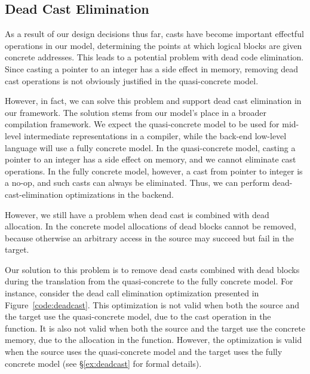 \subsection{Dead Cast Elimination}
\label{idea:deadcast}

As a result of our design decisions thus far, casts have become
important effectful operations in our model, determining the points at
which logical blocks are given concrete addresses. This leads to a
potential problem with dead code elimination.  Since casting a pointer
to an integer has a side effect in memory, removing dead cast
operations is not obviously justified in the quasi-concrete model.

However, in fact,
we can solve this problem and support dead cast elimination in our
framework. 
The solution stems from our model's place in a broader compilation
framework. We expect the quasi-concrete model to be used for mid-level
intermediate representations in a compiler, while the back-end
low-level language will use a fully concrete model. In the
quasi-concrete model, casting a pointer to an integer has a side
effect on memory, and we cannot eliminate cast operations. In the
fully concrete model, however, a cast from pointer to integer is a 
no-op, and such casts can always be eliminated. Thus, we can
perform dead-cast-elimination optimizations in the backend.

However, we still have a problem when dead cast is combined with dead
allocation. In the concrete model allocations of dead blocks cannot be
removed, because otherwise an arbitrary access in the source may
succeed but fail in the target. 

Our solution to this problem is to remove dead casts combined with dead blocks during
the translation from the quasi-concrete to the fully concrete model.
For instance, consider the dead call elimination optimization presented in Figure~\ref{code:deadcast}. This optimization is not valid when both the source and
the target use the quasi-concrete model, due to the cast operation in the
function. It is also not valid when both the source and the target use
the concrete memory, due to the allocation in the function. However, the optimization is valid when the source uses the
quasi-concrete model and the target uses the fully concrete model (see \S\ref{ex:deadcast} for formal details).

